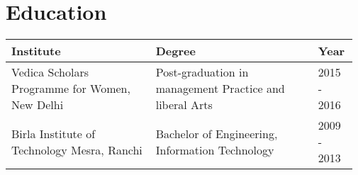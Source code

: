 \section{Education}


\begin{table}[htbp]
    \centering
    \renewcommand{\arraystretch}{.85} %
    \setlength{\arrayrulewidth}{.7pt} %
    \begin{tabularx}{.97\textwidth}{|>{\centering\arraybackslash}p{0.40\linewidth}|>{\centering\arraybackslash}p{0.45\linewidth}|>{\centering\arraybackslash}p{0.115\linewidth}|}
        \hline
        \rowcolor[gray]{0.9}
        \small Institute & \small Degree & \small Year \\
        \hline
        \small Vedica Scholars Programme for Women, New Delhi & \small Post-graduation in management Practice and liberal Arts & \small 2015 - 2016 \\
        \hline
        \small Birla Institute of Technology Mesra, Ranchi & \small Bachelor of Engineering, Information Technology & \small 2009 - 2013 \\
        \hline
    \end{tabularx}

\end{table}

